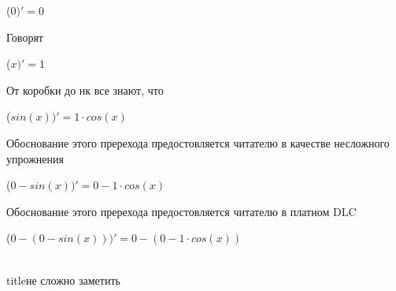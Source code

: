 \documentclass[12pt,a4paper,fleqn]{article}
\begin{document}
\begin{center}
\begin{center}
\begin{center}
\begin{center}
\begin{center}
\begin{center}
\begin{center}
\begin{center}
\begin{center}
\begin{center}
\begin{center}
\begin{center}
\begin{center}
\begin{center}
\begin{center}
\begin{center}
\begin{center}
\begin{center}
\begin{center}
\begin{center}
\begin{center}
\begin{center}
\begin{center}
\begin{center}
\begin{center}
\begin{center}
\begin{center}
\begin{center}
\begin{center}
\begin{center}
\begin{center}
\begin{center}
\begin{center}
\begin{center}
\begin{center}
\begin{center}
\begin{center}
\begin{center}
\begin{center}
\begin{center}
\begin{center}
\begin{center}
\begin{center}
\begin{center}
\begin{center}
\begin{center}
\begin{center}
\begin{center}
\begin{center}
\begin{center}
\begin{center}
\begin{center}
\begin{center}
\begin{center}
\begin{center}
\begin{center}
\begin{center}
\begin{center}
\begin{center}
\begin{center}
\begin{center}
\begin{center}
\begin{center}
\begin{center}
\begin{center}
\begin{center}
\begin{center}
\begin{center}
\begin{center}
\begin{center}
\begin{center}
\begin{center}
\begin{center}
\begin{center}
\begin{center}
\begin{center}
\begin{center}
\begin{center}
\begin{center}
\begin{center}
\begin{center}
 ($0)'
  = 0$\end{center}
Говорят

\begin{center}
 ($x)'
  = 1$\end{center}
От коробки до нк все знают, что

\begin{center}
 ($sin(x))'
  = 1 \cdot cos(x)$\end{center}
Обоснование этого пререхода предостовляется читателю в качестве несложного упрожнения

\begin{center}
 ($0-sin(x))'
  = 0-1 \cdot cos(x)$\end{center}
Обоснование этого пререхода предостовляется читателю в платном DLC

\begin{center}
 ($0-(0-sin(x)))'
  = 0-(0-1 \cdot cos(x))$\end{center}
\\ title{не сложно заметить} 


\end{center}
\end{center}
\end{center}
\end{center}
\end{center}
\end{center}
\end{center}
\end{center}
\end{center}
\end{center}
\end{center}
\end{center}
\end{center}
\end{center}
\end{center}
\end{center}
\end{center}
\end{center}
\end{center}
\end{center}
\end{center}
\end{center}
\end{center}
\end{center}
\end{center}
\end{center}
\end{center}
\end{center}
\end{center}
\end{center}
\end{center}
\end{center}
\end{center}
\end{center}
\end{center}
\end{center}
\end{center}
\end{center}
\end{center}
\end{center}
\end{center}
\end{center}
\end{center}
\end{center}
\end{center}
\end{center}
\end{center}
\end{center}
\end{center}
\end{center}
\end{center}
\end{center}
\end{center}
\end{center}
\end{center}
\end{center}
\end{center}
\end{center}
\end{center}
\end{center}
\end{center}
\end{center}
\end{center}
\end{center}
\end{center}
\end{center}
\end{center}
\end{center}
\end{center}
\end{center}
\end{center}
\end{center}
\end{center}
\end{center}
\end{center}
\end{center}
\end{center}
\end{center}
\end{center}
\end{center}
\end{document}
